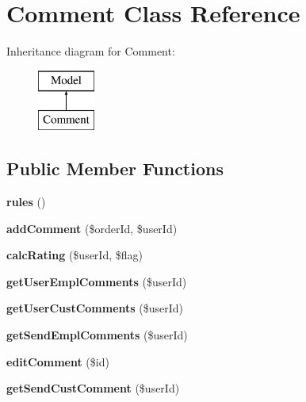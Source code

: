 \hypertarget{classapp_1_1models_1_1_comment}{}\section{Comment Class Reference}
\label{classapp_1_1models_1_1_comment}
Inheritance diagram for Comment\+:\begin{figure}[H]
\begin{center}
\leavevmode
\includegraphics[height=2.000000cm]{classapp_1_1models_1_1_comment}
\end{center}
\end{figure}
\subsection*{Public Member Functions}
\begin{DoxyCompactItemize}
\item 
\hypertarget{classapp_1_1models_1_1_comment_a17dba92d96b9dd48c62f3ede3eef94d4}{}\label{classapp_1_1models_1_1_comment_a17dba92d96b9dd48c62f3ede3eef94d4} 
{\bfseries rules} ()
\item 
\hypertarget{classapp_1_1models_1_1_comment_a45fa8ff74582dbb9c4f54d46694f01db}{}\label{classapp_1_1models_1_1_comment_a45fa8ff74582dbb9c4f54d46694f01db} 
{\bfseries add\+Comment} (\$order\+Id, \$user\+Id)
\item 
\hypertarget{classapp_1_1models_1_1_comment_a7b020e66baff292f121ae507294a84b1}{}\label{classapp_1_1models_1_1_comment_a7b020e66baff292f121ae507294a84b1} 
{\bfseries calc\+Rating} (\$user\+Id, \$flag)
\item 
\hypertarget{classapp_1_1models_1_1_comment_a09847fa3ea7e3ef93e703be2ea161d45}{}\label{classapp_1_1models_1_1_comment_a09847fa3ea7e3ef93e703be2ea161d45} 
{\bfseries get\+User\+Empl\+Comments} (\$user\+Id)
\item 
\hypertarget{classapp_1_1models_1_1_comment_a9b3a5dacb33575cdc4ec086ffc88f9aa}{}\label{classapp_1_1models_1_1_comment_a9b3a5dacb33575cdc4ec086ffc88f9aa} 
{\bfseries get\+User\+Cust\+Comments} (\$user\+Id)
\item 
\hypertarget{classapp_1_1models_1_1_comment_ad75c16015a54db10075453d0ab31aa71}{}\label{classapp_1_1models_1_1_comment_ad75c16015a54db10075453d0ab31aa71} 
{\bfseries get\+Send\+Empl\+Comments} (\$user\+Id)
\item 
\hypertarget{classapp_1_1models_1_1_comment_acbbb2a29fac4fc3870d5d84c495de3f7}{}\label{classapp_1_1models_1_1_comment_acbbb2a29fac4fc3870d5d84c495de3f7} 
{\bfseries edit\+Comment} (\$id)
\item 
\hypertarget{classapp_1_1models_1_1_comment_ac8e85a14c66da26256047c07602ae38f}{}\label{classapp_1_1models_1_1_comment_ac8e85a14c66da26256047c07602ae38f} 
{\bfseries get\+Send\+Cust\+Comment} (\$user\+Id)
\end{DoxyCompactItemize}
